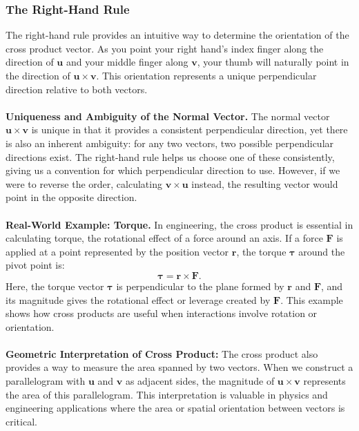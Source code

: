\subsubsection*{The Right-Hand Rule}
\noindent The right-hand rule provides an intuitive way to determine the orientation of the cross product vector. As you point your right hand’s index finger along the direction of \( \mathbf{u} \) and your middle finger along \( \mathbf{v} \), your thumb will naturally point in the direction of \( \mathbf{u} \times \mathbf{v} \). This orientation represents a unique perpendicular direction relative to both vectors. \\ \\  \textbf{Uniqueness and Ambiguity of the Normal Vector.} The normal vector \( \mathbf{u} \times \mathbf{v} \) is unique in that it provides a consistent perpendicular direction, yet there is also an inherent ambiguity: for any two vectors, two possible perpendicular directions exist. The right-hand rule helps us choose one of these consistently, giving us a convention for which perpendicular direction to use. However, if we were to reverse the order, calculating \( \mathbf{v} \times \mathbf{u} \) instead, the resulting vector would point in the opposite direction. \\ \\ \textbf{Real-World Example: Torque.} In engineering, the cross product is essential in calculating torque, the rotational effect of a force around an axis. If a force \( \mathbf{F} \) is applied at a point represented by the position vector \( \mathbf{r} \), the torque \( \boldsymbol{\tau} \) around the pivot point is:
\[
\boldsymbol{\tau} = \mathbf{r} \times \mathbf{F}.
\]
Here, the torque vector \( \boldsymbol{\tau} \) is perpendicular to the plane formed by \( \mathbf{r} \) and \( \mathbf{F} \), and its magnitude gives the rotational effect or leverage created by \( \mathbf{F} \). This example shows how cross products are useful when interactions involve rotation or orientation. \\ \\ \textbf{Geometric Interpretation of Cross Product:} The cross product also provides a way to measure the area spanned by two vectors. When we construct a parallelogram with \( \mathbf{u} \) and \( \mathbf{v} \) as adjacent sides, the magnitude of \( \mathbf{u} \times \mathbf{v} \) represents the area of this parallelogram. This interpretation is valuable in physics and engineering applications where the area or spatial orientation between vectors is critical.

